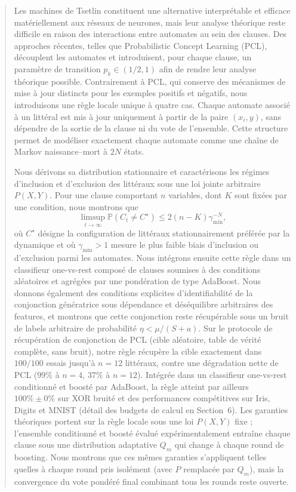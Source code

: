 \documentclass[12pt,a4paper]{article}
\begin{document}
\begin{abstract}
Les machines de Tsetlin constituent une alternative interprétable et
efficace matériellement aux réseaux de neurones, mais leur analyse théorique
reste difficile en raison des interactions entre automates au sein des
clauses. Des approches récentes, telles que Probabilistic Concept Learning
(PCL), découplent les automates et introduisent, pour chaque clause, un
paramètre de transition $p_k\in(1/2,1)$ afin de rendre leur analyse
théorique possible. Contrairement à PCL, qui conserve des mécanismes de
mise à jour distincts pour les exemples positifs et négatifs, nous
introduisons une règle locale unique à quatre cas. Chaque automate associé
à un littéral est mis à jour uniquement à partir de la paire $(x_i,y)$,
sans dépendre de la sortie de la clause ni du vote de l'ensemble. Cette
structure permet de modéliser exactement chaque automate comme une chaîne
de Markov naissance--mort à $2N$ états.

Nous dérivons sa distribution stationnaire et caractérisons les régimes
d'inclusion et d'exclusion des littéraux sous une loi jointe arbitraire
$P(X,Y)$. Pour une clause comportant $n$ variables, dont $K$ sont fixées
par une condition, nous montrons que
\[
\limsup_{t\to\infty}
\mathbb{P}\!\left(C_t\neq C^\star\right)
\leq
2(n-K)\gamma_{\min}^{-N},
\]
où $C^\star$ désigne la configuration de littéraux stationnairement
préférée par la dynamique et où $\gamma_{\min}>1$ mesure le plus faible
biais d'inclusion ou d'exclusion parmi les automates. Nous intégrons ensuite
cette règle dans un classifieur one-vs-rest composé de clauses soumises à
des conditions aléatoires et agrégées par une pondération de type AdaBoost.
Nous donnons également des conditions explicites d'identifiabilité de la
conjonction génératrice sous dépendance et déséquilibre arbitraires des
features, et montrons que cette conjonction reste récupérable sous un bruit
de labels arbitraire de probabilité $\eta<\mu/(S+a)$. Sur le protocole de
récupération de conjonction de PCL (cible aléatoire, table de vérité
complète, sans bruit), notre règle récupère la cible exactement dans
$100/100$ essais jusqu'à $n{=}12$ littéraux, contre une dégradation nette
de PCL ($99\%$ à $n{=}4$, $37\%$ à $n{=}12$). Intégrée dans un classifieur
one-vs-rest conditionné et boosté par AdaBoost, la règle atteint par
ailleurs $100\%\pm0\%$ sur XOR bruité et des performances compétitives sur
Iris, Digits et MNIST (détail des budgets de calcul en Section~6). Les
garanties théoriques portent sur la règle locale sous une loi $P(X,Y)$
fixe ; l'ensemble conditionné et boosté évalué expérimentalement entraîne
chaque clause sous une distribution adaptative $Q_m$ qui change à chaque
round de boosting. Nous montrons que ces mêmes garanties s'appliquent telles
quelles à chaque round pris isolément (avec $P$ remplacée par $Q_m$), mais
la convergence du vote pondéré final combinant tous les rounds reste
ouverte.
\end{abstract}
\end{document}
